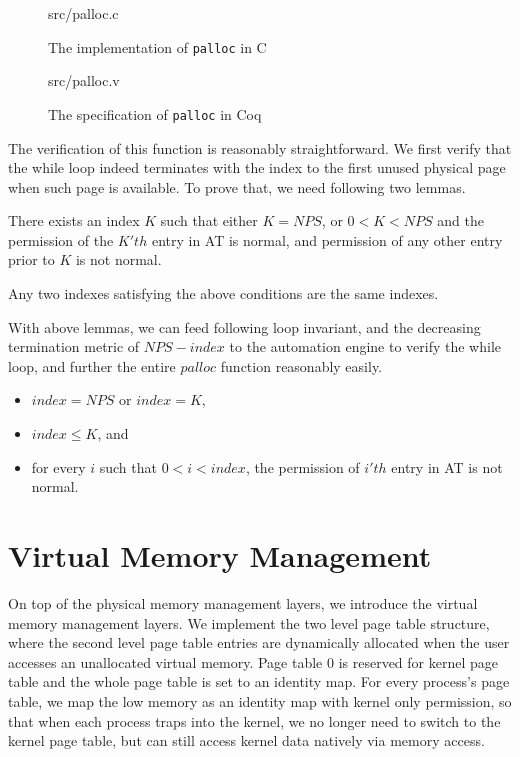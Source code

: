 \begin{figure}
	 {src/palloc.c}
	\caption{The implementation of \texttt{palloc} in C}
	\label{fig:palloc_c}
\end{figure}

\begin{figure}
	 {src/palloc.v}
	\caption{The specification of \texttt{palloc} in Coq}
	\label{fig:palloc_v}
\end{figure}

The verification of this function is reasonably straightforward. We first verify that
the while loop indeed terminates with the index to the first unused physical page when such page is available.
To prove that, we need following two lemmas.

\begin{lemma}[Termination] There exists an index $K$ such that either $K=NPS$, or $0<K<NPS$ and the permission of the $K'th$ entry
in AT is normal, and permission of any other entry prior to $K$ is not normal.
\end{lemma}

\begin{lemma} [Unique] Any two indexes satisfying the above conditions are the same indexes.
\end{lemma}

With above lemmas, we can feed following loop invariant, and the decreasing termination metric of $NPS-index$ to 
the automation engine to verify the while loop, and further the entire $palloc$ function reasonably easily.

\begin{definition} 
\begin{itemize}
\item $index=NPS$ or $index=K$,
\item $index\le K$, and
\item for every $i$ such that $0<i<index$, the permission of $i'th$ entry in AT is not normal.
\end{itemize}
\end{definition}



\section{Virtual Memory Management}

On top of the physical memory management layers, we introduce the
virtual memory management layers.
We implement the two level page table structure, where the second level
page table entries are dynamically allocated when the user accesses an unallocated virtual memory.
Page table 0 is reserved for kernel page table and the whole page table is set to an identity map.
For every process's page table, we map the low memory as an identity map with kernel only permission,
so that when each process traps into the kernel, we no longer need to switch to the kernel page table, 
but can still access kernel data natively via memory access.

